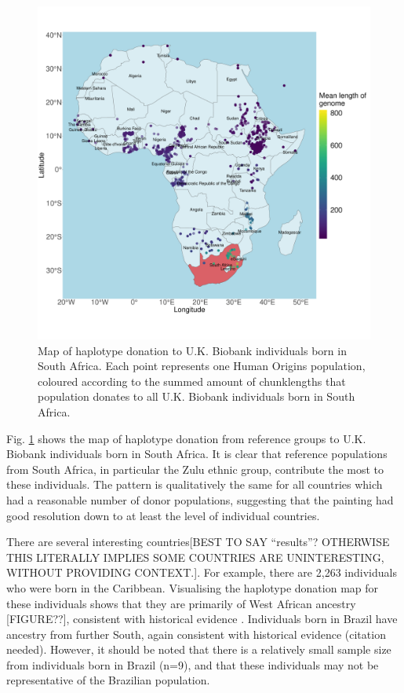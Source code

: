 \begin{figure}[htp]
    \centering
    \includegraphics[width=1.0\textwidth]{../images/chapter3/haplotype_map_SouthAfrica.pdf}
    \caption{Map of haplotype donation to U.K. Biobank individuals born in South Africa. Each point represents one Human Origins population, coloured according to the summed amount of chunklengths that population donates to all U.K. Biobank individuals born in South Africa. }
    \label{fig:haplotype_map_SouthAfrica}
\end{figure}

Fig. \ref{fig:haplotype_map_SouthAfrica} shows the map of haplotype donation from reference groups to U.K. Biobank individuals born in South Africa. It is clear that reference populations from South Africa, in particular the Zulu ethnic group, contribute the most to these individuals. The pattern is qualitatively the same for all countries which had a reasonable number of donor populations, suggesting that the painting had good resolution down to at least the level of individual countries.

There are several interesting {\color{red}countries[BEST TO SAY ``results''? OTHERWISE THIS LITERALLY IMPLIES SOME COUNTRIES ARE UNINTERESTING, WITHOUT PROVIDING CONTEXT.]}. For example, there are 2,263 individuals who were born in the Caribbean. Visualising the haplotype donation map for these individuals shows that they are primarily of West African ancestry {\color{red}[FIGURE??]}, consistent with historical evidence \cite{micheletti2020genetic}. Individuals born in Brazil have ancestry from further South, again consistent with historical evidence (citation needed). However, it should be noted that there is a relatively small sample size from individuals born in Brazil (n=9), and that these individuals may not be representative of the Brazilian population. 

